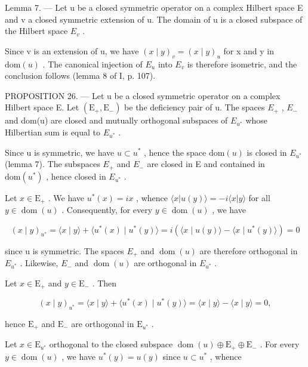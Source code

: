 Lemma 7. --- Let u be a closed symmetric operator on a complex Hilbert space E and v a closed symmetric extension of u. The domain of u is a closed subspace of the Hilbert space \(E_{v}\) .

Since v is an extension of u, we have \((x \mid y)_{v} = (x \mid y)_{u}\) for x and y in \(\text{dom}(u)\) . The canonical injection of \(E_{u}\) into \(E_{v}\) is therefore isometric, and the conclusion follows (lemma 8 of I, p. 107).

PROPOSITION 26. --- Let u be a closed symmetric operator on a complex Hilbert space E. Let \((\mathrm{E}_{+}, \mathrm{E}_{-})\) be the deficiency pair of u. The spaces \(E_{+}\) , \(E_{-}\) and dom(u) are closed and mutually orthogonal subspaces of \(E_{u^{*}}\) whose Hilbertian sum is equal to \(E_{u^{*}}\) .

Since u is symmetric, we have \(u \subset u^{*}\) , hence the space \(\text{dom}(u)\) is closed in \(E_{u^{*}}\) (lemma 7). The subspaces \(E_{+}\) and \(E_{-}\) are closed in E and contained in \(\text{dom}(u^{*})\) , hence closed in \(E_{u^{*}}\) .

Let \(x \in \mathrm{E}_{+}\) . We have \(u^{*}(x) = ix\) , whence \(\langle x | u(y) \rangle = -i\langle x | y \rangle\) for all \(y \in \operatorname{dom}(u)\) . Consequently, for every \(y \in \operatorname{dom}(u)\) , we have

\[
(x \mid y) _ {u ^ {*}} = \langle x \mid y \rangle + \langle u ^ {*} (x) \mid u ^ {*} (y) \rangle = i (\langle x \mid u (y) \rangle - \langle x \mid u ^ {*} (y) \rangle) = 0
\]

since u is symmetric. The spaces \(E_{+}\) and \(\operatorname{dom}(u)\) are therefore orthogonal in \(E_{u^{*}}\) . Likewise, \(E_{-}\) and \(\operatorname{dom}(u)\) are orthogonal in \(E_{u^{*}}\) .

Let \(x \in \mathrm{E}_{+}\) and \(y \in \mathrm{E}_{-}\) . Then

\[
(x \mid y) _ {u ^ {*}} = \langle x \mid y \rangle + \langle u ^ {*} (x) \mid u ^ {*} (y) \rangle = \langle x \mid y \rangle - \langle x \mid y \rangle = 0,
\]

hence \(\mathrm{E}_{+}\) and \(\mathrm{E}_{-}\) are orthogonal in \(\mathrm{E}_{u^{*}}\) .

Let \(x \in \mathrm{E}_{u^*}\) orthogonal to the closed subspace \(\operatorname{dom}(u) \oplus \mathrm{E}_+ \oplus \mathrm{E}_-\) . For every \(y \in \operatorname{dom}(u)\) , we have \(u^*(y) = u(y)\) since \(u \subset u^*\) , whence

